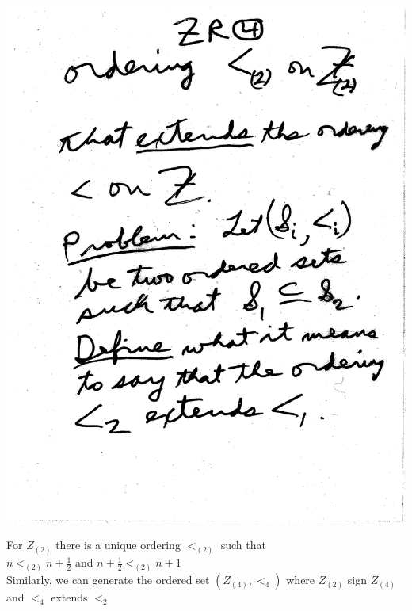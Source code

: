 \documentclass[10pt,a4paper]{article}
\begin{document}
{{\includegraphics[scale=0.5]{Pages/ZR_4}

\newpage

For $Z_{(2)}$ there is a unique ordering $<_{(2)}$ such that\\
$n<_{(2)} n+\frac{1}{2}$ and $n+\frac{1}{2} <_{(2)} n+1$\\
Similarly, we can generate the ordered set $(Z_{(4)}, <_{4})$ where $Z_{(2)}$  sign  $Z_{(4)}$ and $<_{4}$ extends $<_{2}$

}}
\end{document}
